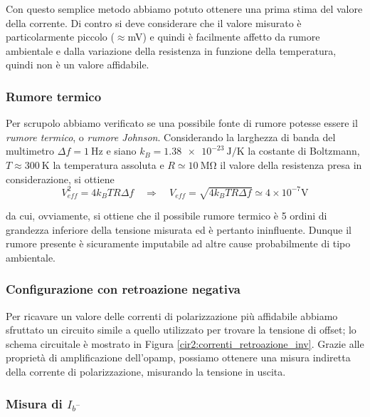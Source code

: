 Con questo semplice metodo abbiamo potuto ottenere una prima stima del valore della corrente.
Di contro si deve considerare che il valore misurato è particolarmente piccolo ($\approx$\si{\milli\volt}) e quindi è facilmente affetto da rumore ambientale e dalla variazione della resistenza in funzione della temperatura, quindi non è un valore affidabile.

\subsubsection*{Rumore termico}

Per scrupolo abbiamo verificato se una possibile fonte di rumore potesse essere il \textit{rumore termico}, o \textit{rumore Johnson}.
Considerando la larghezza di banda del multimetro $\Delta f = \SI{1}{\hertz}$ e siano $k_B = \SI{1.38e-23}{\joule\per\kelvin}$ la costante di Boltzmann, $T \approx \SI{300}{\kelvin}$ la temperatura assoluta e $R \simeq \SI{10}{\mega\ohm}$ il valore della resistenza presa in considerazione, si ottiene
\begin{equation}
	V_{eff}^2 = 4 k_B T R \Delta f \quad \Rightarrow \quad V_{eff} = \sqrt{4 k_B T R \Delta f} \simeq 4 \times 10^{-7} \si{\volt}
\end{equation}

da cui, ovviamente, si ottiene che il possibile rumore termico è 5 ordini di grandezza inferiore della tensione misurata ed è pertanto ininfluente.
Dunque il rumore presente è sicuramente imputabile ad altre cause probabilmente di tipo ambientale.

\subsubsection{Configurazione con retroazione negativa}

Per ricavare un valore delle correnti di polarizzazione più affidabile abbiamo sfruttato un circuito simile a quello utilizzato per trovare la tensione di offset; lo schema circuitale è mostrato in Figura \ref{cir2:correnti_retroazione_inv}.
Grazie alle proprietà di amplificazione dell'opamp, possiamo ottenere una misura indiretta della corrente di polarizzazione, misurando la tensione in uscita.

\subsubsection*{Misura di $I_{b^-}$}

